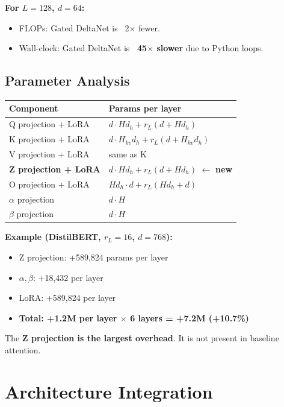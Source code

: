 \textbf{For $L = 128$, $d = 64$:}
\begin{itemize}
\item FLOPs: Gated DeltaNet is ~2$\times$ fewer.
\item Wall-clock: Gated DeltaNet is \textbf{~45$\times$ slower} due to Python loops.

\end{itemize}
\subsection{Parameter Analysis}

\begin{table}[H]
\centering
\small
\begin{tabular}{ll}
\toprule
\textbf{Component} & \textbf{Params per layer} \\
\midrule
Q projection + LoRA & $d \cdot H d_h + r_L(d + H d_h)$ \\
K projection + LoRA & $d \cdot H_{kv} d_h + r_L(d + H_{kv} d_h)$ \\
V projection + LoRA & same as K \\
\textbf{Z projection + LoRA} & $d \cdot H d_h + r_L(d + H d_h)$ $\leftarrow$ \textbf{new} \\
O projection + LoRA & $H d_h \cdot d + r_L(H d_h + d)$ \\
$\alpha$ projection & $d \cdot H$ \\
$\beta$ projection & $d \cdot H$ \\
\bottomrule
\end{tabular}
\end{table}

\textbf{Example (DistilBERT, $r_L = 16$, $d = 768$):}
\begin{itemize}
\item Z projection: +589,824 params per layer
\item $\alpha, \beta$: +18,432 per layer
\item LoRA: +589,824 per layer
\item \textbf{Total: +1.2M per layer $\times$ 6 layers = +7.2M (+10.7\%)}

\end{itemize}
The \textbf{Z projection is the largest overhead}. It is not present in baseline 
attention.




\section{Architecture Integration}


